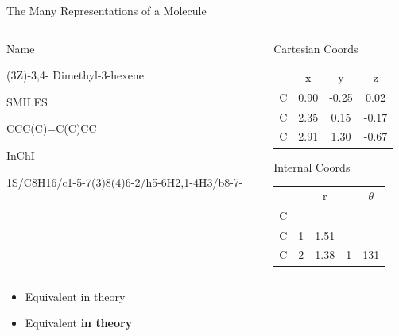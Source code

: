 \documentclass[10pt]{beamer}
\begin{document}
{\begin{frame}{The Many Representations of a Molecule}
\begin{columns}[c]
    \begin{column}{0.3\textwidth}
      \item[] {\alert{Name}}
      \item[] {(3Z)-3,4- \newline Dimethyl-3-hexene}
      \item[] {\alert{SMILES}}
      \item[] {CCC(C)=C(C)CC}
      \item[] {\alert{InChI}}
      \item[] {1S/C8H16/c1-5-7(3)8(4)6-2/h5-6H2,1-4H3/b8-7-}
    \end{column}

    \begin{column}{0.33\textwidth}
      \item[] {\alert{Cartesian Coords}}
      \item[] {
        \vspace*{-\baselineskip}
        \begin{tabular}{l c c c}
              &         x    &       y     &      z  \\
          C   &       0.90   &    -0.25    &    0.02 \\
          C   &       2.35   &     0.15    &   -0.17 \\
          C   &       2.91   &     1.30    &   -0.67 \\
        \end{tabular}

      }
      \item[]{}
      \item[] {\alert{Internal Coords}}
      \item[] {
        \vspace*{-\baselineskip}
        \begin{tabular}{l c c c c}
          &   &   r  &   &  $\theta$ \\
        C &   &      &   &           \\
        C & 1 & 1.51 &   &           \\
        C & 2 & 1.38 & 1 & 131       \\
        \end{tabular}
      }
    \end{column}
  \end{columns}
  \begin{itemize}
    \item[]<only@2> {Equivalent in theory}
    \item[]<only@3> {Equivalent \alert{\textbf{in theory}}}
  \end{itemize}
\end{frame}
}
\end{document}
